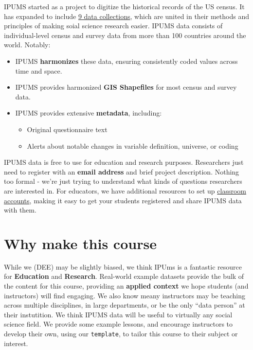 \documentclass[
]{book}
\providecommand{\tightlist}{%
  \setlength{\itemsep}{0pt}\setlength{\parskip}{0pt}}
\begin{document}
IPUMS started as a project to digitize the historical records of the US census. It has expanded to include \href{https://www.ipums.org/}{9 data collections}, which are united in their methods and principles of making soial science research easier. IPUMS data consists of individual-level census and survey data from more than 100 countries around the world. Notably:

\begin{itemize}
\tightlist
\item
  IPUMS \textbf{harmonizes} these data, ensuring consistently coded values across time and space.
\item
  IPUMS provides harmonized \textbf{GIS Shapefiles} for most census and survey data.
\item
  IPUMS provides extensive \textbf{metadata}, including:

  \begin{itemize}
  \tightlist
  \item
    Original questionnaire text
  \item
    Alerts about notable changes in variable definition, universe, or coding
  \end{itemize}
\end{itemize}

IPUMS data is free to use for education and research purposes. Researchers just need to register with an \textbf{email address} and brief project description. Nothing too formal - we're just trying to understand what kinds of questions researchers are interested in. For educators, we have additional resources to set up \href{}{classroom accounts}, making it easy to get your students registered and share IPUMS data with them.

\hypertarget{why-make-this-course}{%
\section*{Why make this course}\label{why-make-this-course}}

While we (DEE) may be slightly biased, we think IPUms is a fantastic resource for \textbf{Education} and \textbf{Research}. Real-world example datasets provide the bulk of the content for this course, providing an \textbf{applied context} we hope students (and instructors) will find engaging. We also know meany instructors may be teaching across multiple disciplines, in large departments, or be the only ``data person'' at their instutition. We think IPUMS data will be useful to virtually any social science field. We provide some example lessons, and encourage instructors to develop their own, using our \texttt{template}, to tailor this course to their subject or interest.
\end{document}
